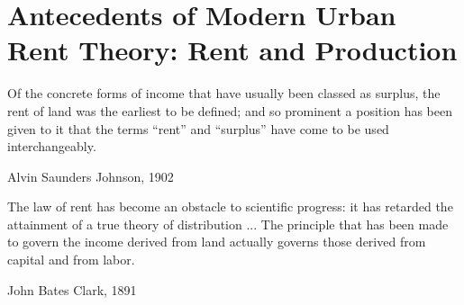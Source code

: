 \chapter{Antecedents of Modern Urban Rent Theory: Rent and Production} \label{chapter-rent}

\epigraph{Of the concrete forms of income that have usually been classed as surplus, the rent of land was the earliest to be defined; and so prominent a position has been given to it that the terms ``rent'' and ``surplus'' have come to be used interchangeably.}{Alvin Saunders Johnson, 1902 \cite{johnsonRentModernEconomic1902}}
\epigraph{The law of rent has become an obstacle to scientific progress: it has retarded the attainment of a true theory of distribution ... %
The principle that has been made to govern the income derived from land actually governs those derived from capital and from labor. 
}{John Bates Clark, 1891 \cite{clarkDistributionDeterminedLaw1891}}









